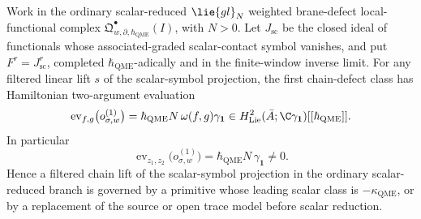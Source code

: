 \begin{prop}\label{prop:app-first-scalar-lift-obstruction}
  Work in the ordinary scalar-reduced \(\lie{gl}_N\) weighted
  brane-defect local-functional complex
  \(\mathfrak Q^\bullet_{w,\partial,\hbar_{\mathrm{QME}}}(I)\), with \(N>0\).  Let
  \(J_{\mathrm{sc}}\) be the closed ideal of functionals whose
  associated-graded scalar-contact symbol vanishes, and put
  \(F^r=J_{\mathrm{sc}}^r\), completed
  \(\hbar_{\mathrm{QME}}\)-adically and in the finite-window inverse
  limit.  For any filtered linear lift \(s\) of the
  scalar-symbol projection, the first chain-defect class has Hamiltonian
  two-argument evaluation
  \[
    \operatorname{ev}_{f,g}\bigl(o_{\sigma,w}^{(1)}\bigr)
      =
    \hbar_{\mathrm{QME}}N\,\omega(f,g)\gamma_{\mathbf 1}
      \in H^2_{\mathrm{Lie}}(\bar A;\C\gamma_{\mathbf 1})
        [[\hbar_{\mathrm{QME}}]] .
  \]
  In particular
  \[
    \operatorname{ev}_{z_1,z_2}\bigl(o_{\sigma,w}^{(1)}\bigr)
      =\hbar_{\mathrm{QME}}N\,\gamma_{\mathbf 1}\neq0 .
  \]
  Hence a filtered chain lift of the scalar-symbol projection in the
  ordinary scalar-reduced branch is governed by a primitive whose leading
  scalar class is \(-\kappa_{\mathrm{QME}}\), or by a replacement of the source
  or open trace model before scalar reduction.
\end{prop}

